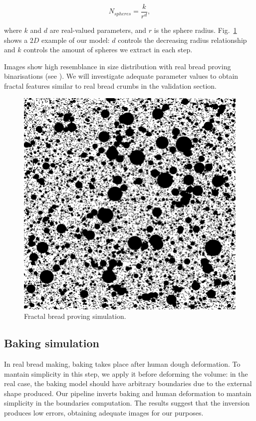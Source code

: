 \documentclass[final,5p,times]{elsarticle}
\begin{document}
{\begin{equation}
N_{spheres} = \frac{k}{r^{d}},
\end{equation}

\noindent where $k$ and $d$ are real-valued parameters, and  $r$ is the sphere radius. Fig.~\ref{FigProving} shows a $2D$ example of our model: $d$ controls the decreasing radius relationship and $k$ controls the amount of spheres we extract in each step.

Images show high resemblance in size distribution with real bread proving binarisations (see \cite{Babin2006}). We will investigate adequate parameter values to obtain fractal features similar to real bread crumbs in the validation section.


\begin{figure}
\includegraphics[scale=0.28]{bubbles.png}
\caption{Fractal bread proving simulation.}
\label{FigProving}
\end{figure}


\subsection{Baking simulation}
In real bread making, baking takes place after human dough deformation. To mantain simplicity in this step, we apply it before deforming the volume: in the real case, the baking model should have arbitrary boundaries due to the external shape produced.  Our pipeline inverts baking and human deformation to mantain simplicity in the boundaries computation. The results suggest that the inversion produces low errors, obtaining adequate images for our purposes.

}
\end{document}
